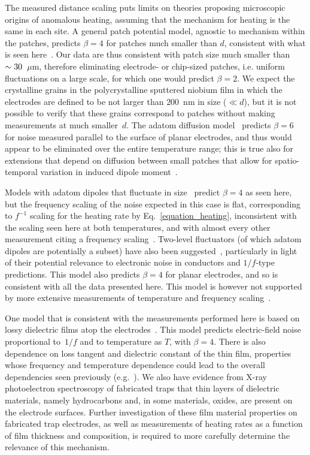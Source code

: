 \documentclass[reprint,twocolumn,prl,amsmath,amssymb,longbibliography,aps,superscriptaddress]{revtex4-1}
\begin{document}
The measured distance scaling puts limits on theories proposing microscopic origins of anomalous heating, assuming that the mechanism for heating is the same in each site.  A general patch potential model, agnostic to mechanism within the patches, predicts $\beta=4$ for patches much smaller than $d$, consistent with what is seen here~\cite{PhysRevA.80.031402,PhysRevA.84.053425,Brownnutt2015}.  Our data are thus consistent with patch size much smaller than $\sim\nobreak30$~$\mu$m, therefore eliminating electrode- or chip-sized patches, i.e. uniform fluctuations on a large scale, for which one would predict $\beta=2$.  We expect the crystalline grains in the polycrystalline sputtered niobium film in which the electrodes are defined to be not larger than $200$~nm in size ($\ll d$), but it is not possible to verify that these grains correspond to patches without making measurements at much smaller~$d$.  The adatom diffusion model~\cite{theBible,Brownnutt2015} predicts $\beta=6$ for noise measured parallel to the surface of planar electrodes, and thus would appear to be eliminated over the entire temperature range; this is true also for extensions that depend on diffusion between small patches that allow for spatio-temporal variation in induced dipole moment~\cite{Brownnutt2015,PhysRevA.95.033407}.

Models with adatom dipoles that fluctuate in size~\cite{PhysRevA.87.023421} predict $\beta=4$ as seen here, but the frequency scaling of the noise expected in this case is flat, corresponding to $f^{-1}$ scaling for the heating rate by Eq.~\ref{equation_heating}, inconsistent with the scaling seen here at both temperatures, and with almost every other measurement citing a frequency scaling~\cite{Brownnutt2015}.  Two-level fluctuators (of which adatom dipoles are potentially a subset) have also been suggested~\cite{RevModPhys.53.497,Brownnutt2015}, particularly in light of their potential relevance to electronic noise in conductors and $1/f$-type predictions.  This model also predicts $\beta=4$ for planar electrodes, and so is consistent with all the data presented here.  This model is however not supported by more extensive measurements of temperature and frequency scaling~\cite{Labaziewicz2008,Bruzewicz2015}.

One model that is consistent with the measurements performed here is based on lossy dielectric films atop the electrodes~\cite{kumph_NJP_2016}.  This model predicts electric-field noise proportional to~$1/f$ and to temperature as $T$, with $\beta=4$.  There is also dependence on loss tangent and dielectric constant of the thin film, properties whose frequency and temperature dependence could lead to the overall dependencies seen previously (e.g.~\cite{Bruzewicz2015}).  We also have evidence from X-ray photoelectron spectroscopy of fabricated traps that thin layers of dielectric materials, namely hydrocarbons and, in some materials, oxides, are present on the electrode surfaces.  Further investigation of these film material properties on fabricated trap electrodes, as well as measurements of heating rates as a function of film thickness and composition, is required to more carefully determine the relevance of this mechanism.
\end{document}
